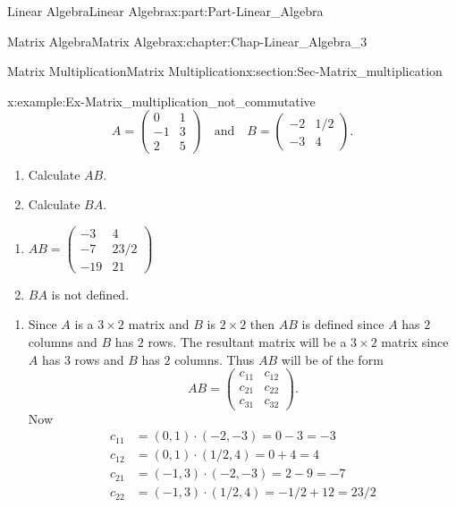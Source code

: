 \documentclass[oneside,10pt,]{book}
\numberwithin{equation}{section}
\newcommand{\amp}{&}
\begin{document}
\begin{partptx}{Linear Algebra}{}{Linear Algebra}{}{}{x:part:Part-Linear_Algebra}
\begin{chapterptx}{Matrix Algebra}{}{Matrix Algebra}{}{}{x:chapter:Chap-Linear_Algebra_3}
\begin{sectionptx}{Matrix Multiplication}{}{Matrix Multiplication}{}{}{x:section:Sec-Matrix_multiplication}
\begin{example}{}{x:example:Ex-Matrix_multiplication_not_commutative}
\begin{equation*}
A=\begin{pmatrix} 0 \amp 1 \\ -1 \amp 3 \\ 2 \amp 5 \end{pmatrix} \quad \mbox{and} \quad B=\begin{pmatrix} -2 \amp 1/2 \\ -3 \amp 4 \end{pmatrix}.
\end{equation*}
%
\begin{enumerate}[label=\alph*]
\item{}Calculate \(AB\).%
\item{}Calculate \(BA\).%
\end{enumerate}
%
\par\smallskip%
\noindent\hypertarget{g:answer:id570376}{}%
\begin{enumerate}[label=\alph*]
\item{}\(\displaystyle AB=\begin{pmatrix} -3 \amp 4 \\ -7 \amp 23/2 \\ -19 \amp 21 \end{pmatrix}\)%
\item{}\(BA\) is not defined.%
\end{enumerate}
\par\smallskip%
\noindent\hypertarget{g:solution:id570405}{}%
\begin{enumerate}[label=\alph*]
\item{}Since \(A\) is a \(3 \times 2\)  matrix and \(B\) is \(2\times 2\) then \(AB\) is defined since \(A\) has \(2\) columns and \(B\) has \(2\) rows. The resultant matrix will be a \(3 \times 2\)  matrix since \(A\) has \(3\) rows and \(B\) has \(2\) columns. Thus \(AB\) will be of the form%
\begin{equation*}
AB = \begin{pmatrix}c_{11} \amp c_{12}\\ c_{21} \amp c_{22}\\ c_{31} \amp c_{32}\end{pmatrix}.
\end{equation*}
Now%
\begin{align*}
c_{11} \amp = (0,1)\cdot (-2,-3) = 0 -3 = -3 \\
c_{12} \amp = (0,1)\cdot (1/2,4) = 0 + 4 = 4 \\
c_{21} \amp = (-1,3)\cdot (-2,-3) = 2 - 9 = -7 \\
c_{22} \amp = (-1,3)\cdot (1/2,4) = -1/2 +12 = 23/2 \\

\end{align*}
\end{enumerate}
\end{example}
\end{sectionptx}
\end{chapterptx}
\end{partptx}
\end{document}
